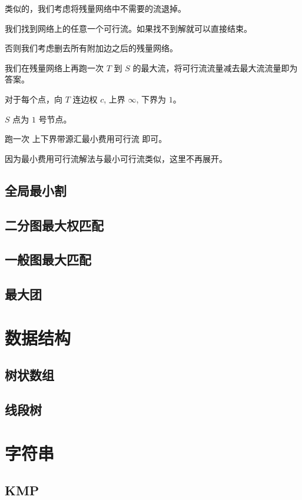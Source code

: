 \documentclass{article}
\begin{document}
类似的，我们考虑将残量网络中不需要的流退掉。

我们找到网络上的任意一个可行流。如果找不到解就可以直接结束。

否则我们考虑删去所有附加边之后的残量网络。

我们在残量网络上再跑一次 $T$ 到 $S$ 的最大流，将可行流流量减去最大流流量即为答案。


对于每个点，向 $T$ 连边权 $c$, 上界 $\infty$, 下界为 $1$。

$S$ 点为 $1$ 号节点。

跑一次 上下界带源汇最小费用可行流 即可。

因为最小费用可行流解法与最小可行流类似，这里不再展开。
\subsection{全局最小割}

\subsection{二分图最大权匹配}

\subsection{一般图最大匹配}

\subsection{最大团}


\section{数据结构}
\subsection{树状数组}

\subsection{线段树}
\section{字符串}
\subsection{KMP}

\end{document}
